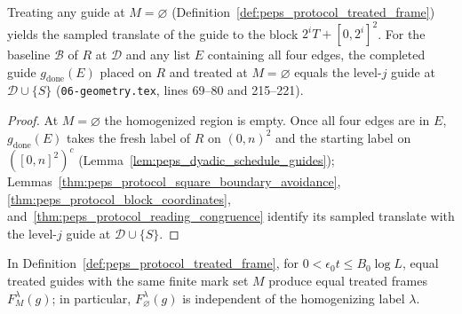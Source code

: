 \begin{lemma}
    \label{thm:peps_protocol_unmarked_guides}
    \leanok
    Treating any guide at $M=\varnothing$ (Definition~\ref{def:peps_protocol_treated_frame}) yields the sampled translate of the guide to the block $2^iT+[0,2^i]^2$. For the baseline $\mathcal B$ of $R$ at $\mathcal D$ and any list $E$ containing all four edges, the completed guide $g_{\mathrm{done}}(E)$ placed on $R$ and treated at $M=\varnothing$ equals the level-$j$ guide at $\mathcal D\cup\{S\}$ (\texttt{06-geometry.tex}, lines 69--80 and 215--221).
\end{lemma}

\begin{proof}\leanok
    At $M=\varnothing$ the homogenized region is empty. Once all four edges are in $E$, $g_{\mathrm{done}}(E)$ takes the fresh label of $R$ on $(0,n)^2$ and the starting label on $([0,n]^2)^c$ (Lemma~\ref{lem:peps_dyadic_schedule_guides}); Lemmas~\ref{thm:peps_protocol_square_boundary_avoidance}, \ref{thm:peps_protocol_block_coordinates}, and~\ref{thm:peps_protocol_reading_congruence} identify its sampled translate with the level-$j$ guide at $\mathcal D\cup\{S\}$.
\end{proof}

\begin{lemma}
    \label{thm:peps_protocol_treated_frame_congruence}
    \leanok
    In Definition~\ref{def:peps_protocol_treated_frame}, for $0<\epsilon_0t\le B_0\log L$, equal treated guides with the same finite mark set $M$ produce equal treated frames $F_M^\lambda(g)$; in particular, $F_\varnothing^\lambda(g)$ is independent of the homogenizing label $\lambda$.
\end{lemma}

